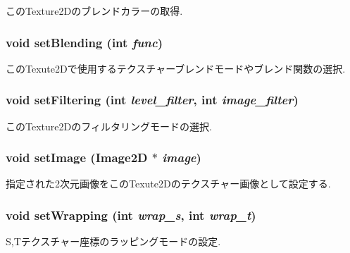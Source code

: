 このTexture2Dのブレンドカラーの取得. \hypertarget{classm3g_1_1Texture2D_189d98ce3e8ac7590be771944b3186d4}{
\subsubsection[{setBlending}]{\setlength{\rightskip}{0pt plus 5cm}void setBlending (int {\em func})}}
\label{classm3g_1_1Texture2D_189d98ce3e8ac7590be771944b3186d4}


このTexute2Dで使用するテクスチャーブレンドモードやブレンド関数の選択. \hypertarget{classm3g_1_1Texture2D_857574b5c0f3e0ca9239bafb4008cae1}{
\subsubsection[{setFiltering}]{\setlength{\rightskip}{0pt plus 5cm}void setFiltering (int {\em level\_\-filter}, \/  int {\em image\_\-filter})}}
\label{classm3g_1_1Texture2D_857574b5c0f3e0ca9239bafb4008cae1}


このTexture2Dのフィルタリングモードの選択. \hypertarget{classm3g_1_1Texture2D_705b89b41cd1b38f664ed912be44baaa}{
\subsubsection[{setImage}]{\setlength{\rightskip}{0pt plus 5cm}void setImage ({\bf Image2D} $\ast$ {\em image})}}
\label{classm3g_1_1Texture2D_705b89b41cd1b38f664ed912be44baaa}


指定された2次元画像をこのTexute2Dのテクスチャー画像として設定する. \hypertarget{classm3g_1_1Texture2D_e676f34bd2f5ee1508ad1cb771702d8f}{
\subsubsection[{setWrapping}]{\setlength{\rightskip}{0pt plus 5cm}void setWrapping (int {\em wrap\_\-s}, \/  int {\em wrap\_\-t})}}
\label{classm3g_1_1Texture2D_e676f34bd2f5ee1508ad1cb771702d8f}


S,Tテクスチャー座標のラッピングモードの設定. 


